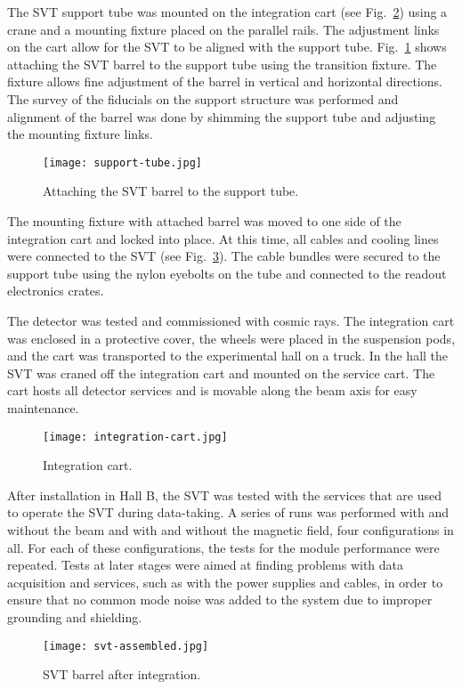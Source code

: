 
The SVT support tube was mounted on the integration cart (see Fig.~\ref{fig:integration-cart}) using a crane and a mounting fixture placed on the parallel rails. The adjustment links on the cart allow for the SVT to be aligned with the support tube. Fig.~\ref{fig:support-tube} shows attaching the SVT barrel to the support tube using the transition fixture. The fixture allows fine adjustment of the barrel in vertical and horizontal directions. The survey of the fiducials on the support structure was performed and alignment of the barrel was done by shimming the support tube and adjusting the mounting fixture links. 

\begin{figure}[hbt] 
\centering 
\texttt{[image: support-tube.jpg]}
\caption{Attaching the SVT barrel to the support tube.}
\label{fig:support-tube}
\end{figure}

The mounting fixture with attached barrel was moved to one side of the integration cart and locked into place. At this time, all cables and cooling lines were connected to the SVT (see Fig.~\ref{fig:svt-assembled}). The cable bundles were secured to the support tube using the nylon eyebolts on the tube and connected to the readout electronics crates. 

The detector was tested and commissioned with cosmic rays. The integration cart was enclosed in a protective cover, the wheels were placed in the suspension pods, and the cart was transported to the experimental hall on a truck. In the hall the SVT was craned off the integration cart and mounted on the service cart. The cart hosts all detector services and is movable along the beam axis for easy maintenance.

\begin{figure}[hbt] 
\centering 
\texttt{[image: integration-cart.jpg]}
\caption{Integration cart.}
\label{fig:integration-cart}
\end{figure}

After installation in Hall B, the SVT was tested with the services that are used to operate the SVT during data-taking. A series of runs was performed with and without the beam and with and without the magnetic field, four configurations in all. For each of these configurations, the tests for the module performance were repeated. Tests at later stages were aimed at finding problems with data acquisition and services, such as with the power supplies and cables, in order to ensure that no common mode noise was added to the system due to improper grounding and shielding. 

\begin{figure}[hbt] 
\centering 
\texttt{[image: svt-assembled.jpg]}
\caption{SVT barrel after integration.}
\label{fig:svt-assembled}
\end{figure}
